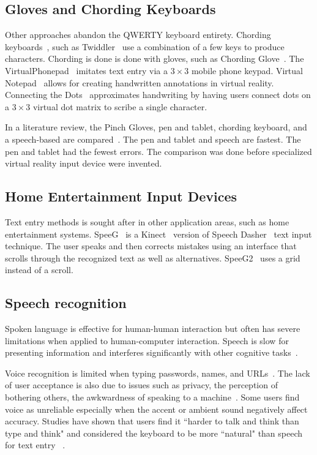 \documentclass{sigchi}
\begin{document}
\subsection{Gloves and Chording Keyboards}
Other approaches abandon the QWERTY keyboard entirety.
Chording keyboards~\cite{noyes1983chord}, such as Twiddler~\cite{lyons2004twiddler} use a combination of a few keys to produce characters.
Chording is done is done with gloves, such as Chording Glove~\cite{rosenberg1999chording}.
The VirtualPhonepad~\cite{ahn2006virtualphonepad} imitates text entry via a $3\times3$ mobile phone keypad.
Virtual Notepad~\cite{poupyrev1998virtual} allows for creating handwritten annotations in virtual reality.
Connecting the Dots~\cite{frees2006connecting} approximates handwriting by having users connect dots on a $3\times3$ virtual dot matrix to scribe a single character.

In a literature review, the Pinch Gloves, pen and tablet, chording keyboard, and a speech-based are compared~\cite{bowman2002text}.
The pen and tablet and speech are fastest.  The pen and tablet had the fewest errors.
The comparison was done before specialized virtual reality input device were invented.

\subsection{Home Entertainment Input Devices}
Text entry methods is sought after in other application areas, such as home entertainment systems.
SpeeG~\cite{hoste2012speeg} is a Kinect~\cite{geerse2015kinematic} version of Speech Dasher~\cite{vertanen2010speech} text input technique.
The user speaks and then corrects mistakes using an interface that scrolls through the recognized text as well as alternatives.
SpeeG2~\cite{hoste2013speeg2} uses a grid instead of a scroll.

\subsection{Speech recognition}
Spoken language is effective for human-human interaction but often has severe limitations when applied to human-computer interaction.
Speech is slow for presenting information and interferes significantly with other cognitive tasks~\cite{shneiderman2000limits}.

Voice recognition is limited when typing passwords, names, and URLs~\cite{TODO}. 
The lack of user acceptance is also due to issues such as privacy, the perception of bothering others, the awkwardness of speaking to a machine~\cite{sawhney2000nomadic}.
Some users find voice as unreliable especially when the accent or ambient sound negatively affect accuracy.
Studies have shown that users find it ``harder to talk and think than type and think" and considered the keyboard to be more ``natural" than speech for text entry ~\cite{Karat:1999:PEC:302979.303160}.
\end{document}
